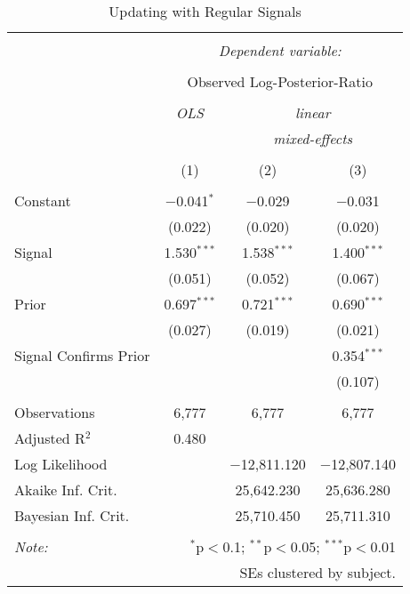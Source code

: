 
\begin{table}[!htbp] \centering 
  \caption{Updating with Regular Signals} 
  \label{tab:regular_updating} 
\begin{tabular}{@{\extracolsep{5pt}}lccc} 
\\[-1.8ex]\hline 
\hline \\[-1.8ex] 
 & \multicolumn{3}{c}{\textit{Dependent variable:}} \\ 
\cline{2-4} 
\\[-1.8ex] & \multicolumn{3}{c}{Observed Log-Posterior-Ratio} \\ 
\\[-1.8ex] & \textit{OLS} & \multicolumn{2}{c}{\textit{linear}} \\ 
 & \textit{} & \multicolumn{2}{c}{\textit{mixed-effects}} \\ 
\\[-1.8ex] & (1) & (2) & (3)\\ 
\hline \\[-1.8ex] 
 Constant & $-$0.041$^{*}$ & $-$0.029 & $-$0.031 \\ 
  & (0.022) & (0.020) & (0.020) \\ 
  Signal & 1.530$^{***}$ & 1.538$^{***}$ & 1.400$^{***}$ \\ 
  & (0.051) & (0.052) & (0.067) \\ 
  Prior & 0.697$^{***}$ & 0.721$^{***}$ & 0.690$^{***}$ \\ 
  & (0.027) & (0.019) & (0.021) \\ 
  Signal Confirms Prior &  &  & 0.354$^{***}$ \\ 
  &  &  & (0.107) \\ 
 \hline \\[-1.8ex] 
Observations & 6,777 & 6,777 & 6,777 \\ 
Adjusted R$^{2}$ & 0.480 &  &  \\ 
Log Likelihood &  & $-$12,811.120 & $-$12,807.140 \\ 
Akaike Inf. Crit. &  & 25,642.230 & 25,636.280 \\ 
Bayesian Inf. Crit. &  & 25,710.450 & 25,711.310 \\ 
\hline 
\hline \\[-1.8ex] 
\textit{Note:}  & \multicolumn{3}{r}{$^{*}$p$<$0.1; $^{**}$p$<$0.05; $^{***}$p$<$0.01} \\ 
 & \multicolumn{3}{r}{SEs clustered by subject.} \\ 
\end{tabular} 
\end{table} 
